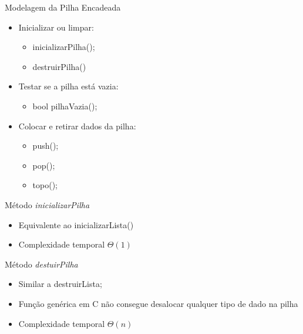 \documentclass[12pt,table,xcolor={dvipsnames}]{beamer}
\begin{document}
\begin{frame}[fragile]{Modelagem da Pilha Encadeada}

\begin{itemize}
\item Inicializar ou limpar:
\begin{itemize}
\item inicializarPilha();
\item destruirPilha()
\end{itemize}
\item Testar se a pilha está vazia:
\begin{itemize}
\item bool pilhaVazia();
\end{itemize}
\item Colocar e retirar dados da pilha:
\begin{itemize}
\item push();
\item pop();
\item topo();
\end{itemize}
\end{itemize}
\end{frame}

\begin{frame}[fragile]{Método \textit{inicializarPilha}}
	\begin{itemize}
		\item Equivalente ao inicializarLista()
		\item Complexidade temporal $\Theta(1)$
	\end{itemize}
\end{frame}

\begin{frame}[fragile]{Método \textit{destuirPilha}}
	\begin{itemize}
		\item Similar a destruirLista;
		\item Função genérica em C não consegue desalocar qualquer tipo de dado na pilha
		\item Complexidade temporal $\Theta(n)$
	\end{itemize}
\end{frame}
\end{document}
